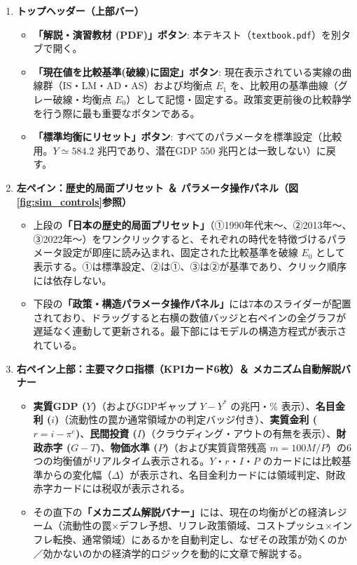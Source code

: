 \documentclass[lualatex,a4paper,11pt,ja=standard]{bxjsarticle}
\begin{document}
\begin{enumerate}[label=\textbf{(\arabic*)},leftmargin=10mm]
  \item \textbf{トップヘッダー（上部バー）}
  \begin{itemize}[leftmargin=5mm,noitemsep]
    \item \textbf{「解説・演習教材 (PDF)」ボタン}: 本テキスト（\texttt{textbook.pdf}）を別タブで開く。
    \item \textbf{「現在値を比較基準(破線)に固定」ボタン}: 現在表示されている実線の曲線群（IS・LM・AD・AS）および均衡点 $E_1$ を、比較用の基準曲線（グレー破線・均衡点 $E_0$）として記憶・固定する。政策変更前後の比較静学を行う際に最も重要なボタンである。
    \item \textbf{「標準均衡にリセット」ボタン}: すべてのパラメータを標準設定（比較用。$Y \simeq 584.2$ 兆円であり、潜在GDP $550$ 兆円とは一致しない）に戻す。
  \end{itemize}

  \item \textbf{左ペイン：歴史的局面プリセット ＆ パラメータ操作パネル（図\ref{fig:sim_controls}参照）}
  \begin{itemize}[leftmargin=5mm,noitemsep]
    \item 上段の\textbf{「日本の歴史的局面プリセット」}（①1990年代末〜、②2013年〜、③2022年〜）をワンクリックすると、それぞれの時代を特徴づけるパラメータ設定が即座に読み込まれ、固定された比較基準を破線 $E_0$ として表示する。①は標準設定、②は①、③は②が基準であり、クリック順序には依存しない。
    \item 下段の\textbf{「政策・構造パラメータ操作パネル」}には7本のスライダーが配置されており、ドラッグすると右横の数値バッジと右ペインの全グラフが遅延なく連動して更新される。最下部にはモデルの構造方程式が表示されている。
  \end{itemize}

  \item \textbf{右ペイン上部：主要マクロ指標（KPIカード6枚）＆ メカニズム自動解説バナー}
  \begin{itemize}[leftmargin=5mm,noitemsep]
    \item \textbf{実質GDP ($Y$)}（およびGDPギャップ $Y - Y^*$ の兆円・$\%$ 表示）、\textbf{名目金利 ($i$)}（流動性の罠か通常領域かの判定バッジ付き）、\textbf{実質金利 ($r = i - \pi^e$)}、\textbf{民間投資 ($I$)}（クラウディング・アウトの有無を表示）、\textbf{財政赤字 ($G - T$)}、\textbf{物価水準 ($P$)}（および実質貨幣残高 $m = 100M/P$）の6つの均衡値がリアルタイム表示される。$Y$・$r$・$I$・$P$ のカードには比較基準からの変化幅（$\Delta$）が表示され、名目金利カードには領域判定、財政赤字カードには税収が表示される。
    \item その直下の\textbf{「メカニズム解説バナー」}には、現在の均衡がどの経済レジーム（流動性の罠×デフレ予想、リフレ政策領域、コストプッシュ×インフレ転換、通常領域）にあるかを自動判定し、なぜその政策が効くのか／効かないのかの経済学的ロジックを動的に文章で解説する。
  \end{itemize}


\end{enumerate}
\end{document}
